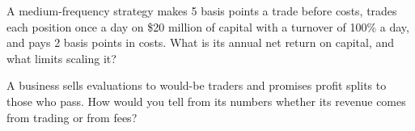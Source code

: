 \begin{interviewq}\label{iq:in:medium-frequency-proprietary-shops:5}
A medium-frequency strategy makes 5 basis points a trade before costs, trades each position once a day on
\$20 million of capital with a turnover of 100\% a day, and pays 2 basis points in costs. What is its annual net return
on capital, and what limits scaling it?
\end{interviewq}

\begin{interviewq}\label{iq:in:medium-frequency-proprietary-shops:6}
A business sells evaluations to would-be traders and promises profit splits to those who pass. How would you tell from
its numbers whether its revenue comes from trading or from fees?
\end{interviewq}
